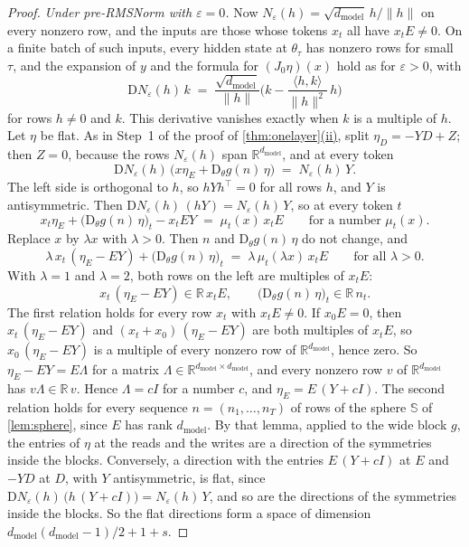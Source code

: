 \documentclass[10pt]{article}
\theoremstyle{definition}
\theoremstyle{remark}
\newcommand{\R}{\mathbb{R}}
\newcommand{\dm}{d_{\mathrm{model}}}
\newcommand{\Der}{\mathrm{D}}
\newcommand{\norm}[1]{\lVert #1\rVert}
\DeclareRobustCommand{\cpref}[2]{\hyperref[#1:#2]{\cref*{#1}(#2)}}
\begin{document}
\begin{proof}
\emph{Under pre-RMSNorm with $\varepsilon = 0$.} Now $N_\varepsilon(h) = \sqrt{\dm}\,h/\norm{h}$ on every nonzero row, and the inputs are those whose tokens $x_t$ all have $x_tE \neq 0$. On a finite batch of such inputs, every hidden state at $\theta_\tau$ has nonzero rows for small $\tau$, and the expansion of $y$ and the formula for $(J_0\eta)(x)$ hold as for $\varepsilon > 0$, with
\[
\Der N_\varepsilon(h)\,k \;=\; \frac{\sqrt{\dm}}{\norm{h}}\Big(k - \frac{\langle h, k\rangle}{\norm{h}^2}\,h\Big)
\]
for rows $h \neq 0$ and $k$. This derivative vanishes exactly when $k$ is a multiple of $h$. Let $\eta$ be flat. As in Step~1 of the proof of \cpref{thm:onelayer}{ii}, split $\eta_D = -YD + Z$; then $Z = 0$, because the rows $N_\varepsilon(h)$ span $\R^{\dm}$, and at every token
\[
\Der N_\varepsilon(h)\,\big(x\eta_E + \Der_\theta g(n)\,\eta\big) \;=\; N_\varepsilon(h)\,Y .
\]
The left side is orthogonal to $h$, so $hYh^\top = 0$ for all rows $h$, and $Y$ is antisymmetric. Then $\Der N_\varepsilon(h)\,(hY) = N_\varepsilon(h)\,Y$, so at every token $t$
\[
x_t\eta_E + \big(\Der_\theta g(n)\,\eta\big)_t - x_tEY \;=\; \mu_t(x)\,x_tE \qquad\text{for a number } \mu_t(x).
\]
Replace $x$ by $\lambda x$ with $\lambda > 0$. Then $n$ and $\Der_\theta g(n)\,\eta$ do not change, and
\[
\lambda\,x_t\,(\eta_E - EY) + \big(\Der_\theta g(n)\,\eta\big)_t \;=\; \lambda\,\mu_t(\lambda x)\,x_tE \qquad\text{for all } \lambda > 0 .
\]
With $\lambda = 1$ and $\lambda = 2$, both rows on the left are multiples of $x_tE$:
\[
x_t\,(\eta_E - EY) \in \R\,x_tE, \qquad \big(\Der_\theta g(n)\,\eta\big)_t \in \R\,n_t .
\]
The first relation holds for every row $x_t$ with $x_tE \neq 0$. If $x_0E = 0$, then $x_t\,(\eta_E - EY)$ and $(x_t + x_0)\,(\eta_E - EY)$ are both multiples of $x_tE$, so $x_0\,(\eta_E - EY)$ is a multiple of every nonzero row of $\R^{\dm}$, hence zero. So $\eta_E - EY = E\Lambda$ for a matrix $\Lambda \in \R^{\dm\times\dm}$, and every nonzero row $v$ of $\R^{\dm}$ has $v\Lambda \in \R\,v$. Hence $\Lambda = cI$ for a number $c$, and $\eta_E = E\,(Y + cI)$. The second relation holds for every sequence $n = (n_1, \dots, n_T)$ of rows of the sphere $\mathbb S$ of \cref{lem:sphere}, since $E$ has rank $\dm$. By that lemma, applied to the wide block $g$, the entries of $\eta$ at the reads and the writes are a direction of the symmetries inside the blocks. Conversely, a direction with the entries $E\,(Y + cI)$ at $E$ and $-YD$ at $D$, with $Y$ antisymmetric, is flat, since $\Der N_\varepsilon(h)\,\big(h\,(Y + cI)\big) = N_\varepsilon(h)\,Y$, and so are the directions of the symmetries inside the blocks. So the flat directions form a space of dimension $\dm(\dm-1)/2 + 1 + s$.


\end{proof}
\end{document}
